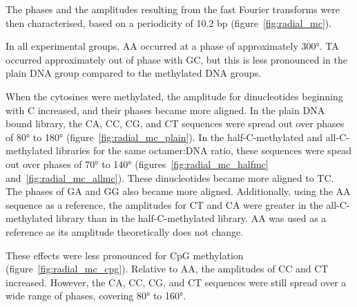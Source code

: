 \documentclass[parskip=full, numbers=noenddot]{scrbook}
\begin{document}
The phases and the amplitudes resulting from the fast Fourier transforms were then characterised, based on a periodicity of 10.2 bp (figure~\ref{fig:radial_mc}).

In all experimental groups, AA occurred at a phase of approximately \ang{300}.  TA occurred approximately out of phase with GC, but this is less pronounced in the plain DNA group compared to the methylated DNA groups.

When the cytosines were methylated, the amplitude for dinucleotides beginning with C increased, and their phases became more aligned.  In the plain DNA bound library, the CA, CC, CG, and CT sequences were spread out over phases of \ang{80} to \ang{180} (figure~\ref{fig:radial_mc_plain}).  In the half-C-methylated and all-C-methylated libraries for the same octamer:DNA ratio, these sequences were spead out over phases of \ang{70} to \ang{140} (figures~\ref{fig:radial_mc_halfmc} and~\ref{fig:radial_mc_allmc}).  These dinucleotides became more aligned to TC.  The phases of GA and GG also became more aligned.  Additionally, using the AA sequence as a reference, the amplitudes for CT and CA were greater in the all-C-methylated library than in the half-C-methylated library.  AA was used as a reference as its amplitude theoretically does not change. %

These effects were less pronounced for CpG methylation (figure~\ref{fig:radial_mc_cpg}).  Relative to AA, the amplitudes of CC and CT increased.  However, the CA, CC, CG, and CT sequences were still spread over a wide range of phases, covering \ang{80} to \ang{160}.
\end{document}

